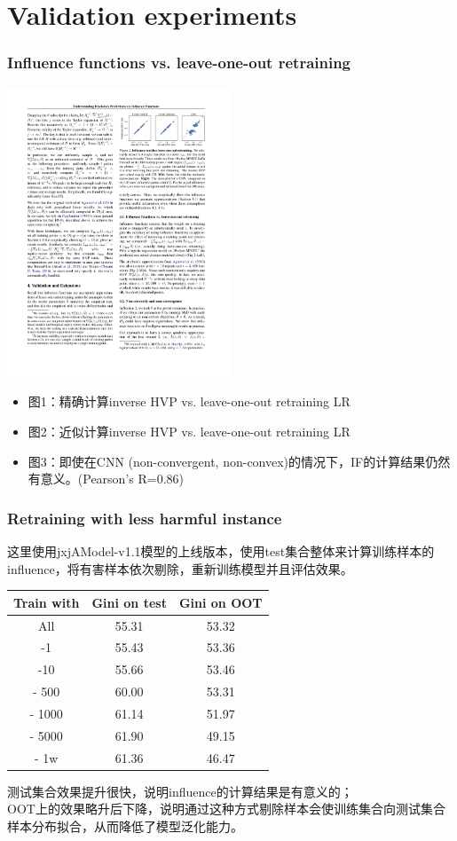 \documentclass[UTF8]{beamer}
\begin{document}
\section{Validation experiments}
\begin{frame}
\frametitle{Influence functions vs. leave-one-out retraining}
\begin{center}
\includegraphics[width=0.5\textwidth]{corr.pdf}
\end{center}
\begin{itemize}
\item 图1：精确计算inverse HVP vs. leave-one-out retraining LR
\item 图2：近似计算inverse HVP vs. leave-one-out retraining LR
\item 图3：即使在CNN (non-convergent, non-convex)的情况下，IF的计算结果仍然有意义。(Pearson's R=0.86)
\end{itemize}
\end{frame}

\begin{frame}
\frametitle{Retraining with less harmful instance}
这里使用jxjAModel-v1.1模型的上线版本，使用test集合整体来计算训练样本的influence，将有害样本依次剔除，重新训练模型并且评估效果。
\begin{center}
\begin{tabular}{ | c | c | c | }
  \hline
  Train with & Gini on test & Gini on OOT \\ \hline            
  All & 55.31 & 53.32 \\ \hline      
  -1 & 55.43 & 53.36 \\ \hline      
  -10 & 55.66 & 53.46 \\ \hline
  - 500 & 60.00 & 53.31 \\ \hline
  - 1000 & 61.14 & 51.97 \\ \hline
  - 5000 & 61.90 & 49.15 \\ \hline
  - 1w & 61.36 & 46.47 \\ \hline
\end{tabular}
\end{center}
测试集合效果提升很快，说明influence的计算结果是有意义的；\\
OOT上的效果略升后下降，说明通过这种方式剔除样本会使训练集合向测试集合样本分布拟合，从而降低了模型泛化能力。
\end{frame}
\end{document}
